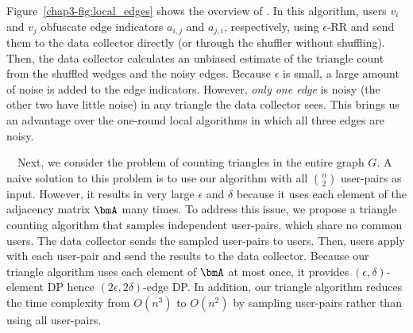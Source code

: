 Figure~\ref{chap3-fig:local_edges} shows the overview of \AlgWSLE{}. 
In this algorithm, users $v_i$ and $v_j$ obfuscate edge indicators $a_{i,j}$ and $a_{j,i}$, respectively, using $\epsilon$-RR and send them to the data collector directly (or through the shuffler without shuffling). 
Then, the data collector calculates an unbiased estimate of the triangle count 
from the shuffled wedges and the noisy edges. 
Because $\epsilon$ is small, a large amount of noise is added to the edge indicators. 
However, \textit{only one edge} is noisy (the other two have little noise) in any triangle the data collector sees. 
This brings us an advantage over the one-round local algorithms in which all three edges are noisy. 

\smallskip
{}~~Next, we consider the problem of counting triangles in the entire graph $G$. 
A naive solution to this problem is to use our 
\AlgWSLE{} algorithm 
with all $\binom{n}{2}$ user-pairs as input. 
However, it results in very large $\epsilon$ and $\delta$ because it uses each element of the adjacency matrix $\bmA$ many times. 
To address this issue, 
we propose a triangle counting algorithm that samples 
independent user-pairs, which share no common users. 
The data collector sends the sampled user-pairs to users. 
Then, users apply 
\AlgWSLE{} 
with each user-pair 
and send the results to the data collector. 
Because our triangle algorithm uses each element of 
$\bmA$ at most once, it provides $(\epsilon,\delta)$-element DP hence $(2\epsilon,2\delta)$-edge DP. 
In addition, our triangle algorithm reduces the time complexity from $O(n^3)$ to $O(n^2)$ by sampling user-pairs rather than using all user-pairs. 


